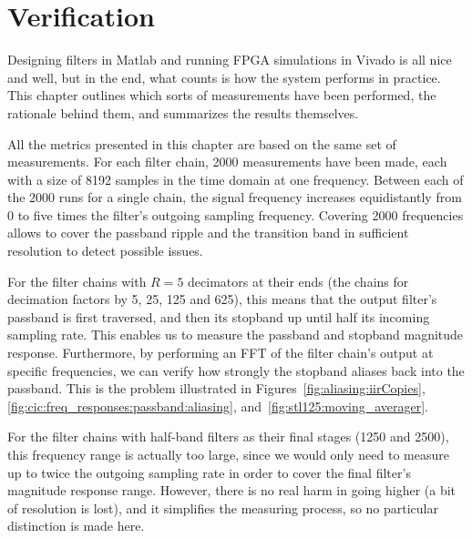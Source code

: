 %
%
%
%
\chapter{Verification} %
\label{ch:verification}

Designing filters  in Matlab  and running  FPGA simulations  in Vivado  is all
nice  and well,  but  in the  end,  what  counts is  how  the system  performs
in  practice. This chapter  outlines  which sorts  of  measurements have  been
performed, the rationale behind them, and summarizes the results themselves.

All  the  metrics  presented  in  this  chapter are  based  on  the  same  set
of  measurements. For each  filter  chain, \num{2000}  measurements have  been
made,  each with  a size  of  \num{8192} samples  in  the time  domain at  one
frequency. Between each of the \num{2000} runs  for a single chain, the signal
frequency  increases equidistantly  from \num{0}  to five  times the  filter's
outgoing sampling  frequency. Covering \num{2000} frequencies allows  to cover
the passband ripple and the transition band in sufficient resolution to detect
possible issues.

For the  filter chains  with $R=5$  decimators at their  ends (the  chains for
decimation factors by \num{5}, \num{25},  \num{125} and \num{625}), this means
that the output filter's passband is first traversed, and then its stopband up
until half its incoming sampling rate. This enables us to measure the passband
and  stopband magnitude  response. Furthermore, by  performing an  FFT of  the
filter chain's output at specific frequencies,  we can verify how strongly the
stopband aliases back into the passband. This is the problem illustrated in
Figures~\ref{fig:aliasing:iirCopies},
\ref{fig:cic:freq_responses:passband:aliasing},
and~\ref{fig:stl125:moving_averager}.

For the filter chains with half-band filters as their final stages (\num{1250}
and \num{2500}),  this frequency range is  actually too large, since  we would
only need to measure up to twice  the outgoing sampling rate in order to cover
the final filter's  magnitude response range.  However, there is  no real harm
in going higher (a bit of resolution is lost), and it simplifies the measuring
process, so no particular distinction is made here.

